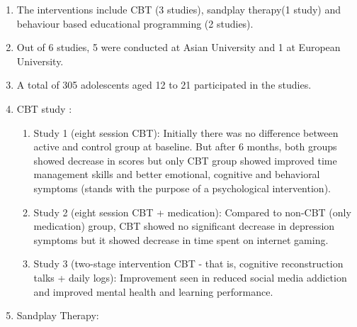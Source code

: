 \documentclass{article}
\begin{document}
\begin{enumerate}
\begin{enumerate}
        Inclusion criteria:
        \begin{itemize}
            \item Randomized Controlled Trials (RCT) study design. 
            That is, there has to be a control group and intervention group randomly chosen.
            \item Participants are diagnoised for internet addiction.
            \item The purpoe of the study was to find the effects of the intervention.
        \end{itemize}
        Exclusion criteria:
        \begin{itemize}
            \item Single group pre-post comparison study. That is, there was no control group.
            \item Study didn't report mean and standard deviations of the addiction levels/scores.
        \end{itemize}
        \item The interventions include CBT (3 studies), sandplay therapy(1 study) and behaviour based educational programming (2 studies).
        \item Out of 6 studies, 5 were conducted at Asian University and 1 at European University.
        \item A total of 305 adolescents aged 12 to 21 participated in the studies.            \item CBT study :
        \begin{enumerate}
            \item Study 1 (eight session CBT): Initially there was no difference between active and control group at baseline. 
            But after 6 months, both groups showed decrease in scores but only CBT group showed improved time management skills and better emotional, cognitive and behavioral symptoms (stands with the purpose of a psychological intervention).
            \item Study 2 (eight session CBT + medication): Compared to non-CBT (only medication) group, CBT showed no significant decrease in depression symptoms but it showed decrease in time spent on internet gaming.
            \item Study 3 (two-stage intervention CBT - that is, cognitive reconstruction talks + daily logs): Improvement seen in reduced social media addiction and improved mental health and learning performance.
        \end{enumerate}
        \item Sandplay Therapy:

\end{enumerate}
\end{enumerate}
\end{document}

